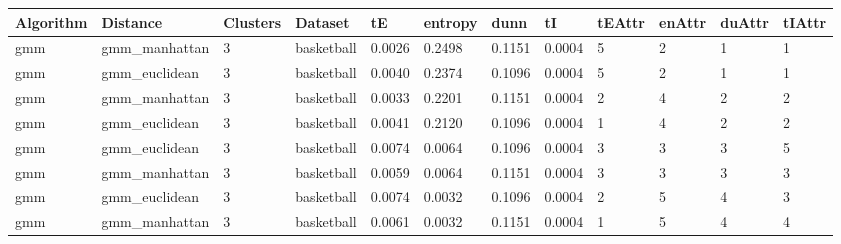 \documentclass[
]{article}
\begin{document}
\begin{longtable}{| p{1.1cm} | p{2cm} | p{0.8cm} | p{1.3cm} | p{0.60cm} | p{0.7cm} | p{0.65cm} | p{0.65cm} | p{0.65cm} | p{0.65cm} | p{0.7cm} | p{0.65cm} |}
\hline
\scriptsize  Algorithm & \scriptsize  Distance  &  \scriptsize Clusters & \scriptsize  Dataset & \scriptsize tE & \scriptsize entropy & \scriptsize  dunn  & \scriptsize tI & \scriptsize tEAttr & \scriptsize enAttr & \scriptsize duAttr & \scriptsize tIAttr  \\
\hline
\scriptsize gmm & \scriptsize gmm\_manhattan & \scriptsize 3 & \scriptsize basketball & \scriptsize 0.0026 & \scriptsize 0.2498 & \scriptsize 0.1151 & \scriptsize 0.0004 & \scriptsize 5 & \scriptsize 2 & \scriptsize 1 & \scriptsize 1 \\
\cline{2-12}
\scriptsize gmm & \scriptsize gmm\_euclidean & \scriptsize 3 & \scriptsize basketball & \scriptsize 0.0040 & \scriptsize 0.2374 & \scriptsize 0.1096 & \scriptsize 0.0004 & \scriptsize 5 & \scriptsize 2 & \scriptsize 1 & \scriptsize 1 \\
\cline{2-12}
\scriptsize gmm & \scriptsize gmm\_manhattan & \scriptsize 3 & \scriptsize basketball & \scriptsize 0.0033 & \scriptsize 0.2201 & \scriptsize 0.1151 & \scriptsize 0.0004 & \scriptsize 2 & \scriptsize 4 & \scriptsize 2 & \scriptsize 2 \\
\cline{2-12}
\scriptsize gmm & \scriptsize gmm\_euclidean & \scriptsize 3 & \scriptsize basketball & \scriptsize 0.0041 & \scriptsize 0.2120 & \scriptsize 0.1096 & \scriptsize 0.0004 & \scriptsize 1 & \scriptsize 4 & \scriptsize 2 & \scriptsize 2 \\
\cline{2-12}
\scriptsize gmm & \scriptsize gmm\_euclidean & \scriptsize 3 & \scriptsize basketball & \scriptsize 0.0074 & \scriptsize 0.0064 & \scriptsize 0.1096 & \scriptsize 0.0004 & \scriptsize 3 & \scriptsize 3 & \scriptsize 3 & \scriptsize 5 \\
\cline{2-12}
\scriptsize gmm & \scriptsize gmm\_manhattan & \scriptsize 3 & \scriptsize basketball & \scriptsize 0.0059 & \scriptsize 0.0064 & \scriptsize 0.1151 & \scriptsize 0.0004 & \scriptsize 3 & \scriptsize 3 & \scriptsize 3 & \scriptsize 3 \\
\cline{2-12}
\scriptsize gmm & \scriptsize gmm\_euclidean & \scriptsize 3 & \scriptsize basketball & \scriptsize 0.0074 & \scriptsize 0.0032 & \scriptsize 0.1096 & \scriptsize 0.0004 & \scriptsize 2 & \scriptsize 5 & \scriptsize 4 & \scriptsize 3 \\
\cline{2-12}
\scriptsize gmm & \scriptsize gmm\_manhattan & \scriptsize 3 & \scriptsize basketball & \scriptsize 0.0061 & \scriptsize 0.0032 & \scriptsize 0.1151 & \scriptsize 0.0004 & \scriptsize 1 & \scriptsize 5 & \scriptsize 4 & \scriptsize 4 \\

\end{longtable}
\end{document}
